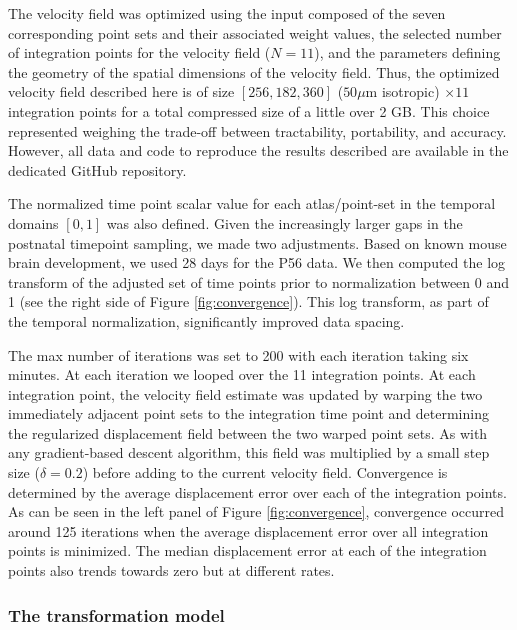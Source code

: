 \documentclass[
  12pt,
]{article}
\begin{document}
The velocity field was optimized using the input composed of the seven
corresponding point sets and their associated weight values, the
selected number of integration points for the velocity field (\(N=11\)),
and the parameters defining the geometry of the spatial dimensions of
the velocity field. Thus, the optimized velocity field described here is
of size \([256, 182, 360]\) (\(50 \mu\)m isotropic) \(\times 11\)
integration points for a total compressed size of a little over 2 GB.
This choice represented weighing the trade-off between tractability,
portability, and accuracy. However, all data and code to reproduce the
results described are available in the dedicated GitHub repository.

The normalized time point scalar value for each atlas/point-set in the
temporal domains \([0, 1]\) was also defined. Given the increasingly
larger gaps in the postnatal timepoint sampling, we made two
adjustments. Based on known mouse brain development, we used 28 days for
the P56 data. We then computed the log transform of the adjusted set of
time points prior to normalization between 0 and 1 (see the right side
of Figure \ref{fig:convergence}). This log transform, as part of the
temporal normalization, significantly improved data spacing.

The max number of iterations was set to 200 with each iteration taking
six minutes. At each iteration we looped over the 11 integration points.
At each integration point, the velocity field estimate was updated by
warping the two immediately adjacent point sets to the integration time
point and determining the regularized displacement field between the two
warped point sets. As with any gradient-based descent algorithm, this
field was multiplied by a small step size (\(\delta = 0.2\)) before
adding to the current velocity field. Convergence is determined by the
average displacement error over each of the integration points. As can
be seen in the left panel of Figure \ref{fig:convergence}, convergence
occurred around 125 iterations when the average displacement error over
all integration points is minimized. The median displacement error at
each of the integration points also trends towards zero but at different
rates.

\hypertarget{the-transformation-model}{%
\subsubsection{The transformation
model}\label{the-transformation-model}}
\end{document}
